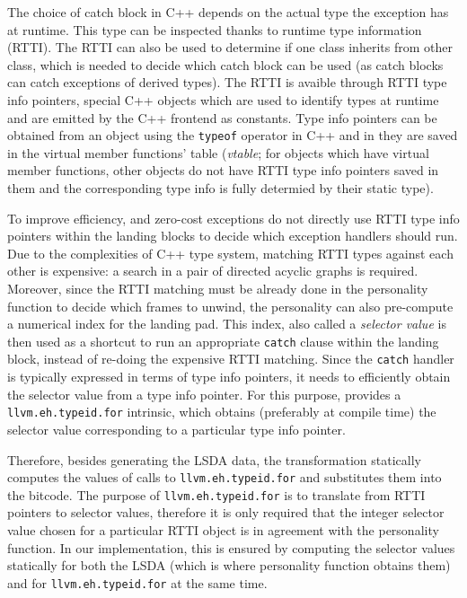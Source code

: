 The choice of catch block in C++ depends on the actual type the exception has
at runtime.
This type can be inspected thanks to runtime type information (RTTI).
The RTTI can also be used to determine if one class inherits from other class,
which is needed to decide which catch block can be used (as catch blocks can
catch exceptions of derived types).
The RTTI is avaible through RTTI type info pointers, special C++ objects which
are used to identify types at runtime and are emitted by the C++ frontend as
constants. 
Type info pointers can be obtained from an object using the \texttt{typeof}
operator in C++ and in \llvm{} they are saved in the virtual member functions'
table (\emph{vtable}; for objects which have virtual member functions, other
objects do not have RTTI type info pointers saved in them and the corresponding
type info is fully determied by their static type).

To improve efficiency, \llvm{} and zero-cost exceptions do not directly use
RTTI type info pointers within the landing blocks to decide which exception
handlers should run.
Due to the complexities of C++ type system, matching RTTI
types against each other is expensive: a search in a pair of directed
acyclic graphs is required. Moreover, since the RTTI matching must be
already done in the personality function to decide which frames to
unwind, the personality can also pre-compute a numerical index for the
landing pad. This index, also called a \emph{selector value} is then
used as a shortcut to run an appropriate \texttt{catch} clause within
the landing block, instead of re-doing the expensive RTTI matching.
Since the \texttt{catch} handler is typically expressed in terms of
type info pointers, it needs to efficiently obtain the selector value
from a type info pointer. For this purpose, \llvm{} provides a
\texttt{llvm.eh.typeid.for} intrinsic, which obtains (preferably at
compile time) the selector value corresponding to a particular type info
pointer.

Therefore, besides generating the LSDA data, the transformation
statically computes the values of
calls to \texttt{llvm.eh.typeid.for} and substitutes them into the bitcode.
The purpose of \texttt{llvm.eh.typeid.for} is to translate from
RTTI pointers to selector values, therefore it is only required that the integer
selector value chosen for a particular RTTI object is in agreement with
the personality function. In our implementation, this is ensured by
computing the selector values statically for both the LSDA (which is
where personality function obtains them) and for
\texttt{llvm.eh.typeid.for} at the same time.

